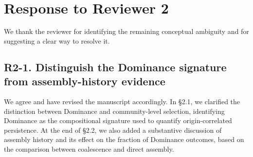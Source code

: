 \section*{Response to Reviewer 2}

We thank the reviewer for identifying the remaining conceptual ambiguity and for suggesting a clear way to resolve it.

\subsection*{R2-1. Distinguish the Dominance signature from assembly-history evidence}


We agree and have revised the manuscript accordingly. In \S2.1, we clarified
the distinction between Dominance and community-level selection, identifying
Dominance as the compositional signature used to quantify origin-correlated
persistence. At the end of \S2.2, we also added a substantive discussion of
assembly history and its effect on the fraction of Dominance outcomes, based on
the comparison between coalescence and direct assembly.
